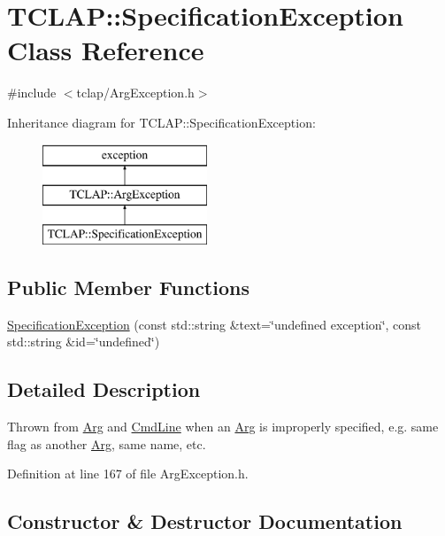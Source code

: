 \hypertarget{class_t_c_l_a_p_1_1_specification_exception}{}\section{T\+C\+L\+A\+P\+:\+:Specification\+Exception Class Reference}
\label{class_t_c_l_a_p_1_1_specification_exception}


{\ttfamily \#include $<$tclap/\+Arg\+Exception.\+h$>$}

Inheritance diagram for T\+C\+L\+A\+P\+:\+:Specification\+Exception\+:\begin{figure}[H]
\begin{center}
\leavevmode
\includegraphics[height=3.000000cm]{class_t_c_l_a_p_1_1_specification_exception}
\end{center}
\end{figure}
\subsection*{Public Member Functions}
\begin{DoxyCompactItemize}
\item 
\hyperlink{class_t_c_l_a_p_1_1_specification_exception_ad817016f03ebf4fc371e168636132abd}{Specification\+Exception} (const std\+::string \&text=\char`\"{}undefined exception\char`\"{}, const std\+::string \&id=\char`\"{}undefined\char`\"{})
\end{DoxyCompactItemize}


\subsection{Detailed Description}
Thrown from \hyperlink{class_t_c_l_a_p_1_1_arg}{Arg} and \hyperlink{class_t_c_l_a_p_1_1_cmd_line}{Cmd\+Line} when an \hyperlink{class_t_c_l_a_p_1_1_arg}{Arg} is improperly specified, e.\+g. same flag as another \hyperlink{class_t_c_l_a_p_1_1_arg}{Arg}, same name, etc. 

Definition at line 167 of file Arg\+Exception.\+h.



\subsection{Constructor \& Destructor Documentation}
\hypertarget{class_t_c_l_a_p_1_1_specification_exception_ad817016f03ebf4fc371e168636132abd}{}
